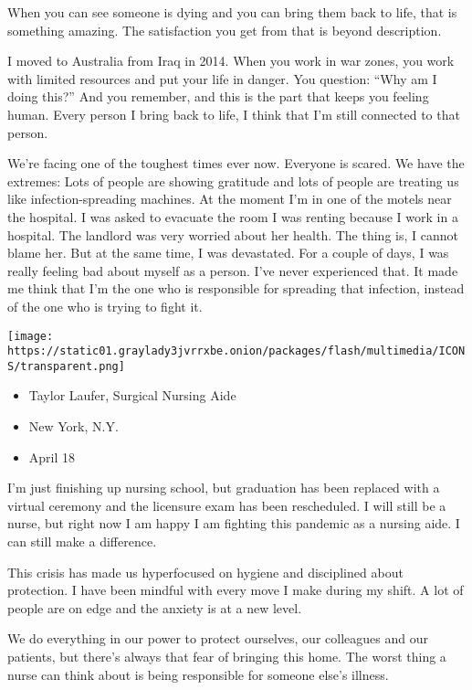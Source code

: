 When you can see someone is dying and you can bring them back to life,
that is something amazing. The satisfaction you get from that is beyond
description.

I moved to Australia from Iraq in 2014. When you work in war zones, you
work with limited resources and put your life in danger. You question:
``Why am I doing this?'' And you remember, and this is the part that
keeps you feeling human. Every person I bring back to life, I think that
I'm still connected to that person.

We're facing one of the toughest times ever now. Everyone is scared. We
have the extremes: Lots of people are showing gratitude and lots of
people are treating us like infection-spreading machines. At the moment
I'm in one of the motels near the hospital. I was asked to evacuate the
room I was renting because I work in a hospital. The landlord was very
worried about her health. The thing is, I cannot blame her. But at the
same time, I was devastated. For a couple of days, I was really feeling
bad about myself as a person. I've never experienced that. It made me
think that I'm the one who is responsible for spreading that infection,
instead of the one who is trying to fight it.

\texttt{[image: https://static01.graylady3jvrrxbe.onion/packages/flash/multimedia/ICONS/transparent.png]}

\begin{itemize}
\tightlist
\item
  Taylor Laufer, Surgical Nursing Aide
\item
  New York, N.Y.
\item
  April 18
\end{itemize}

I'm just finishing up nursing school, but graduation has been replaced
with a virtual ceremony and the licensure exam has been rescheduled. I
will still be a nurse, but right now I am happy I am fighting this
pandemic as a nursing aide. I can still make a difference.

This crisis has made us hyperfocused on hygiene and disciplined about
protection. I have been mindful with every move I make during my shift.
A lot of people are on edge and the anxiety is at a new level.

We do everything in our power to protect ourselves, our colleagues and
our patients, but there's always that fear of bringing this home. The
worst thing a nurse can think about is being responsible for someone
else's illness.

